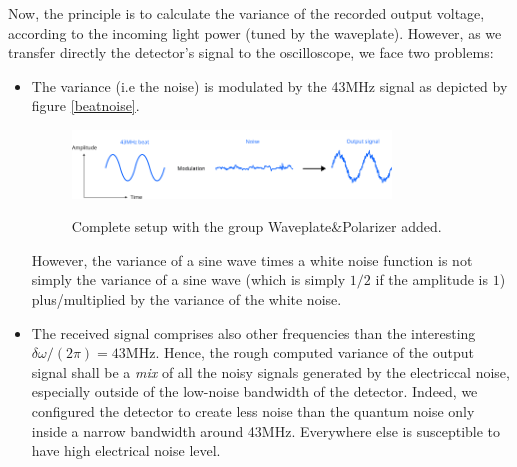 \documentclass[12pt]{report}
\begin{document}
Now, the principle is to calculate the variance of the recorded output voltage, according to the incoming light power (tuned by the waveplate). However, as we transfer directly the detector's signal to the oscilloscope, we face two problems:
\begin{itemize}
	\item The variance (i.e the noise) is modulated by the 43MHz signal as depicted by figure \ref{beatnoise}.
	
	\begin{figure}[h!]
	\caption{Complete setup with the group Waveplate\&Polarizer added.}
	\centering
	\includegraphics[width=0.8\textwidth]{beatnoise}
	\label{fig:beatnoise}
	\end{figure}
	
	However, the variance of a sine wave times a white noise function is not simply the variance of a sine wave (which is simply $1/2$ if the amplitude is $1$) plus/multiplied by the variance of the white noise.
	\item The received signal comprises also other frequencies than the interesting $\delta\omega/(2\pi) = 43$MHz. Hence, the rough computed variance of the output signal shall be a \textit{mix} of all the noisy signals generated by the electriccal noise, especially outside of the low-noise bandwidth of the detector. Indeed, we configured the detector to create less noise than the quantum noise only inside a narrow bandwidth around 43MHz. Everywhere else is susceptible to have high electrical noise level.
\end{itemize}
\end{document}
